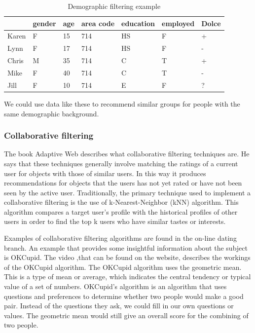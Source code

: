 \documentclass[]{article}
\begin{document}
\begin{table}[h]
    \begin{tabular}{|l|l|l|l|l|l||l|}
    \hline
    ~     & gender & age & area code & education & employed & Dolce \\ \hline
    Karen & F      & 15  & 714       & HS        & F        & +     \\ \hline
    Lynn  & F      & 17  & 714       & HS        & F        & -     \\ \hline
    Chris & M      & 35  & 714       & C         & T        & +     \\ \hline
    Mike  & F      & 40  & 714       & C         & T        & -     \\ \hline
    Jill  & F      & 10  & 714       & E         & F        & ?     \\ \hline
    \end{tabular}
\caption{Demographic filtering example}
\label{table:dfexample}
\end{table}

\noindent We could use data like these to recommend similar groups for people with the same demographic background.

\subsubsection{Collaborative filtering}
The book Adaptive Web \citep{Peter2007} describes what collaborative filtering techniques are.
He says that these techniques generally involve matching the ratings of a current user for objects with those of similar users.
In this way it produces recommendations for objects that the users has not yet rated or have not been seen by the active user.
Traditionally, the primary technique used to implement a collaborative filtering is the use of k-Nearest-Neighbor (kNN) algorithm.
This algorithm compares a target user's profile with the historical profiles of other users in order to find the top k users who have similar tastes or interests.

Examples of collaborative filtering algorithms are found in the on-line dating branch.
An example that provides some insightful information about the subject is OKCupid.
The video ,that can be found on the website\cite{okcupid}, describes the workings of the OKCupid algorithm.
The OKCupid algorithm uses the geometric mean.
This is a type of mean or average, which indicates the central tendency or typical value of a set of numbers.
OKCupid's algorithm is an algorithm that uses questions and preferences to determine whether two people would make a good pair.
Instead of the questions they ask, we could fill in our own questions or values.
The geometric mean would still give an overall score for the combining of two people.\\
\end{document}
